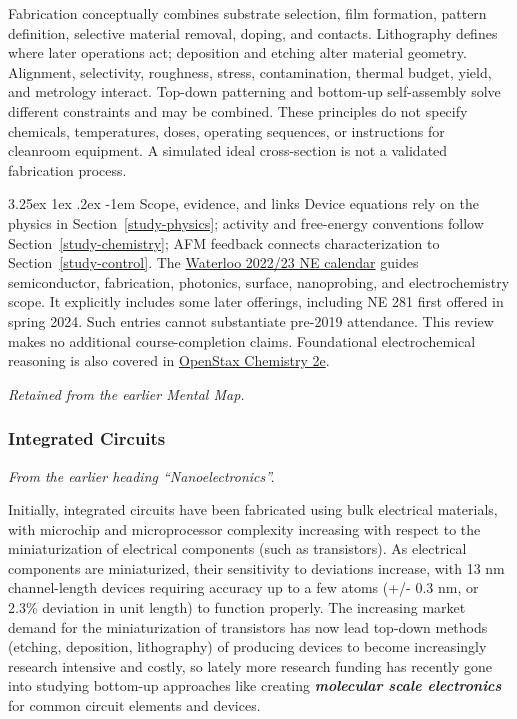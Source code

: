 \documentclass{article}
\makeatletter
\newcounter{subsubsubsection}[subsubsection]
\renewcommand\subparagraph{\@startsection{subparagraph}{6}{\parindent}%
  {3.25ex \@plus1ex \@minus .2ex}%
  {-1em}%
  {\normalfont\normalsize\bfseries}}
\makeatother
\begin{document}
Fabrication conceptually combines substrate selection, film formation, pattern definition, selective material removal, doping, and contacts. Lithography defines where later operations act; deposition and etching alter material geometry. Alignment, selectivity, roughness, stress, contamination, thermal budget, yield, and metrology interact. Top-down patterning and bottom-up self-assembly solve different constraints and may be combined. These principles do not specify chemicals, temperatures, doses, operating sequences, or instructions for cleanroom equipment. A simulated ideal cross-section is not a validated fabrication process.

\subparagraph{Scope, evidence, and links}
Device equations rely on the physics in Section~\ref{study-physics}; activity and free-energy conventions follow Section~\ref{study-chemistry}; AFM feedback connects characterization to Section~\ref{study-control}. The \href{https://ucalendar.uwaterloo.ca/2223/COURSE/course-NE.html}{Waterloo 2022/23 NE calendar} guides semiconductor, fabrication, photonics, surface, nanoprobing, and electrochemistry scope. It explicitly includes some later offerings, including NE 281 first offered in spring 2024. Such entries cannot substantiate pre-2019 attendance. This review makes no additional course-completion claims. Foundational electrochemical reasoning is also covered in \href{https://openstax.org/details/books/chemistry-2e}{OpenStax Chemistry 2e}.

\textit{Retained from the earlier Mental Map.}


\newpage

\subsubsection{Integrated Circuits}\label{sec:integrated-circuits}

\textit{From the earlier heading ``Nanoelectronics''.}


Initially, integrated circuits have been fabricated using bulk electrical materials, with microchip and microprocessor complexity increasing with respect to the miniaturization of electrical components (such as transistors). As electrical components are miniaturized, their sensitivity to deviations increase, with 13 nm channel-length devices requiring accuracy up to a few atoms (+/- 0.3 nm, or 2.3\% deviation in unit length) to function properly. The increasing market demand for the miniaturization of transistors has now lead top-down methods (etching, deposition, lithography) of producing devices to become increasingly research intensive and costly, so lately more research funding has recently gone into studying bottom-up approaches like creating \textbf{\textit{molecular scale electronics}} for common circuit elements and devices. 
\end{document}
